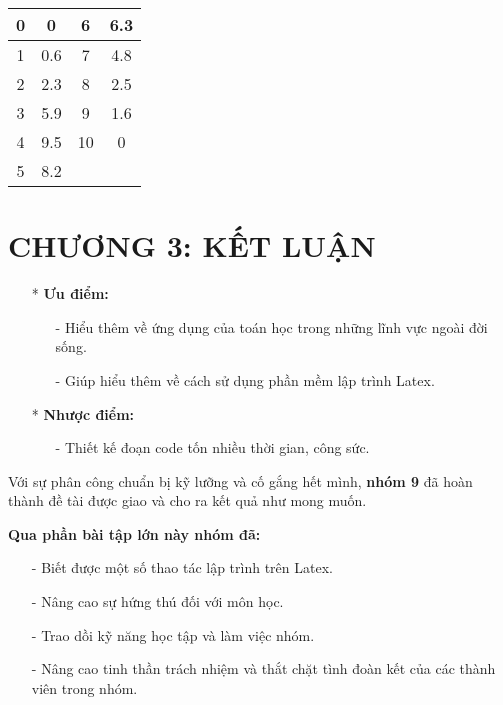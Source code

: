 \documentclass[12pt,a4paper]{article}
\begin{document}
\begin{enumerate}[a/]
\begin{flushleft}
\begin{table}[H]
\begin{tabular}{|c|c|c|c|}
				      \hline
				      0   & 0      & 6   & 6.3    \\
				      \hline
				      1   & 0.6    & 7   & 4.8    \\
				      \hline
				      2   & 2.3    & 8   & 2.5    \\
				      \hline
				      3   & 5.9    & 9   & 1.6    \\
				      \hline
				      4   & 9.5    & 10  & 0      \\
				      \hline
				      5   & 8.2    &     &        \\
				      \hline
			      \end{tabular}
		      \end{table}
	      \end{flushleft}
\end{enumerate}

\newpage
{}
\section*{CHƯƠNG 3: KẾT LUẬN}
\begin{itemize}
	\item[*] \textbf{Ưu điểm:}
	      \begin{itemize}
		      \item[-] Hiểu thêm về ứng dụng của toán học trong những lĩnh vực ngoài đời sống.
		      \item[-] Giúp hiểu thêm về cách sử dụng phần mềm lập trình Latex.
	      \end{itemize}
	\item[*] \textbf{Nhược điểm:}
	      \begin{itemize}
		      \item[-] Thiết kế đoạn code tốn nhiều thời gian, công sức.
	      \end{itemize}
\end{itemize}

\vspace{2em}
Với sự phân công chuẩn bị kỹ lưỡng và cố gắng hết mình, \textbf{nhóm 9} đã hoàn thành đề tài được giao và cho ra kết quả như mong muốn.

\vspace{2em}
\textbf{Qua phần bài tập lớn này nhóm đã:}
\begin{itemize}
	\item[-] Biết được một số thao tác lập trình trên Latex.
	\item[-] Nâng cao sự hứng thú đối với môn học.
	\item[-] Trao dồi kỹ năng học tập và làm việc nhóm.
	\item[-] Nâng cao tinh thần trách nhiệm và thắt chặt tình đoàn kết của các thành viên trong nhóm.
\end{itemize}
\end{document}
